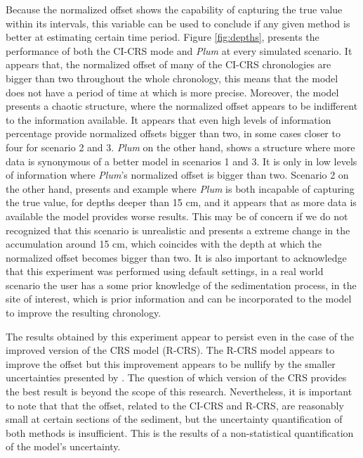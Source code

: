 \documentclass [10pt] {article}
\begin{document}
Because the normalized offset shows the capability of capturing the true value within its intervals, this variable can be used to conclude if any given method is better at estimating certain time period.
Figure \ref{fig:depths}, presents the performance of both the CI-CRS mode and \textit{Plum} at every simulated scenario.
It appears that, the normalized offset of many of the CI-CRS chronologies are bigger than two throughout the whole chronology, this means that the model does not have a period of time at which is more precise. 
Moreover, the model presents a chaotic structure, where the normalized offset appears to be indifferent to the information available.
It appears that even high levels of information percentage provide normalized offsets bigger than two, in some cases closer to four for scenario 2 and 3.
\textit{Plum} on the other hand, shows a structure where more data is synonymous of a better model in scenarios 1 and 3.
It is only in low levels of information where \textit{Plum}'s normalized offset is bigger than two.
Scenario 2 on the other hand, presents and example where \textit{Plum} is both incapable of capturing the true value, for depths deeper than 15 cm, and it appears that as more data is available the model provides worse results. 
This may be of concern if we do not recognized that this scenario is unrealistic and presents a extreme change in the accumulation around 15 cm, which coincides with the depth at which the normalized offset becomes bigger than two.
It is also important to acknowledge that this experiment was performed using default settings, in a real world scenario the user has a some prior knowledge of the sedimentation process, in the site of interest, which is prior information and can be incorporated to the model to improve the resulting chronology.

The results obtained by this experiment appear to persist even in the case of the improved version of the CRS model (R-CRS).
The R-CRS model appears to improve the offset but this improvement appears to be nullify by the smaller uncertainties presented by \citet{Sanchez-Cabeza2014}.
The question of which version of the CRS provides the best result is beyond the scope of this research.
Nevertheless, it is important to note that that the offset, related to the CI-CRS and R-CRS, are reasonably small at certain sections of the sediment, but the uncertainty quantification of both methods is insufficient.  
This is the results of a non-statistical quantification of the model's uncertainty.
\end{document}
